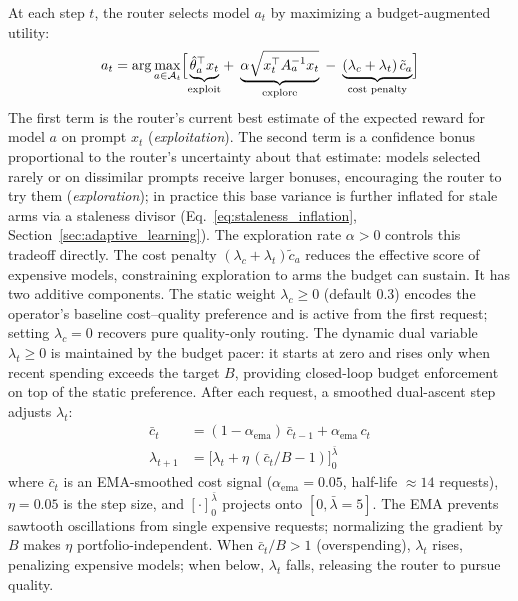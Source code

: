 At each step $t$, the router selects model $a_t$ by maximizing a budget-augmented utility:
\begin{equation}
    a_t = \arg\max_{a \in \mathcal{A}_t} \Bigl[
        \underbrace{\hat\theta_a^\top x_t}_{\text{exploit}}
        +\; \underbrace{\alpha \sqrt{x_t^\top A_a^{-1} x_t}}_{\text{explore}}
        \;-\; \underbrace{(\lambda_c + \lambda_t) \,\tilde{c}_a}_{\text{cost penalty}}
    \Bigr]
    \label{eq:budget_ucb}
\end{equation}
The first term is the router's current best estimate of the expected reward for model $a$ on prompt $x_t$ (\emph{exploitation}). The second term is a confidence bonus proportional to the router's uncertainty about that estimate: models selected rarely or on dissimilar prompts receive larger bonuses, encouraging the router to try them (\emph{exploration}); in practice this base variance is further inflated for stale arms via a staleness divisor (Eq.~\ref{eq:staleness_inflation}, Section~\ref{sec:adaptive_learning}). The exploration rate $\alpha > 0$ controls this tradeoff directly. The cost penalty $(\lambda_c + \lambda_t)\tilde{c}_a$ reduces the effective score of expensive models, constraining exploration to arms the budget can sustain. It has two additive components. The static weight $\lambda_c \geq 0$ (default 0.3) encodes the operator's baseline cost--quality preference and is active from the first request; setting $\lambda_c = 0$ recovers pure quality-only routing. The dynamic dual variable $\lambda_t \geq 0$ is maintained by the budget pacer: it starts at zero and rises only when recent spending exceeds the target $B$, providing closed-loop budget enforcement on top of the static preference. After each request, a smoothed dual-ascent step adjusts $\lambda_t$:
\begin{align}
    \bar{c}_t &= (1 - \alpha_{\mathrm{ema}})\,\bar{c}_{t-1}
                 + \alpha_{\mathrm{ema}}\,c_t
    \label{eq:cost_ema} \\
    \lambda_{t+1} &= \bigl[\lambda_t + \eta\,(\bar{c}_t / B - 1)\bigr]_{0}^{\bar\lambda}
    \label{eq:dual_update}
\end{align}
where $\bar{c}_t$ is an EMA-smoothed cost signal ($\alpha_{\mathrm{ema}}{=}0.05$, half-life ${\approx}14$ requests), $\eta{=}0.05$ is the step size, and $[\cdot]_0^{\bar\lambda}$ projects onto $[0, \bar\lambda{=}5]$. The EMA prevents sawtooth oscillations from single expensive requests; normalizing the gradient by $B$ makes $\eta$ portfolio-independent. When $\bar{c}_t / B > 1$ (overspending), $\lambda_t$ rises, penalizing expensive models; when below, $\lambda_t$ falls, releasing the router to pursue quality.


